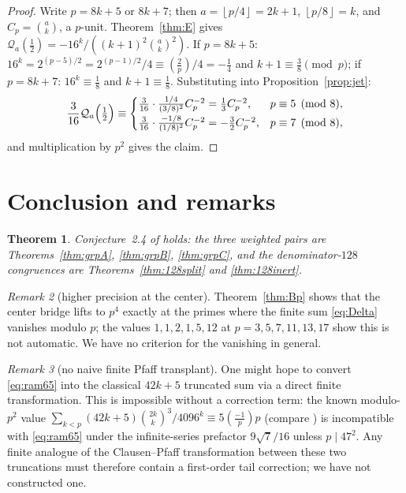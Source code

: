 \documentclass[11pt]{amsart}
\newtheorem{theorem}{Theorem}[section]
\theoremstyle{definition}
\theoremstyle{remark}
\newtheorem{remark}[theorem]{Remark}
\newcommand{\leg}[2]{\left(\frac{#1}{#2}\right)}
\newcommand{\fl}[1]{\left\lfloor #1 \right\rfloor}
\begin{document}
\begin{proof}
Write $p=8k+5$ or $8k+7$; then $a=\fl{p/4}=2k+1$, $\fl{p/8}=k$, and
$C_p=\binom{a}{k}$, a $p$-unit. Theorem~\ref{thm:E} gives
$\mathcal Q_a(\frac12)=-16^k/((k+1)^2\binom{a}{k}^2)$.
If $p=8k+5$: $16^k=2^{(p-5)/2}=2^{(p-1)/2}/4\equiv\leg2p/4=-\frac14$
and $k+1\equiv\frac38\pmod p$; if $p=8k+7$: $16^k\equiv\frac18$ and
$k+1\equiv\frac18$. Substituting into Proposition~\ref{prop:jet}:
\[
\frac{3}{16}\mathcal Q_a\Bigl(\tfrac12\Bigr)\equiv
\begin{cases}
\frac{3}{16}\cdot\frac{1/4}{(3/8)^2}C_p^{-2}=\frac13C_p^{-2},&p\equiv5\pmod8,\\[1mm]
\frac{3}{16}\cdot\frac{-1/8}{(1/8)^2}C_p^{-2}=-\frac32C_p^{-2},&p\equiv7\pmod8,
\end{cases}
\]
and multiplication by $p^2$ gives the claim.
\end{proof}

\section{Conclusion and remarks}\label{sec:8}

\begin{theorem}\label{thm:final}
Conjecture~2.4 of \cite{Sun24} holds: the three weighted pairs are
Theorems~\ref{thm:grpA}, \ref{thm:grpB}, \ref{thm:grpC}, and the
denominator-$128$ congruences are Theorems~\ref{thm:128split} and
\ref{thm:128inert}.
\end{theorem}

\begin{remark}[higher precision at the center]
Theorem~\ref{thm:Bp} shows that the center bridge lifts to $p^4$
exactly at the primes where the finite sum \eqref{eq:Delta} vanishes
modulo $p$; the values $1,1,2,1,5,12$ at $p=3,5,7,11,13,17$ show this
is not automatic. We have no criterion for the vanishing in general.
\end{remark}

\begin{remark}[no naive finite Pfaff transplant]\label{rem:pfaff}
One might hope to convert \eqref{eq:ram65} into the classical $42k+5$
truncated sum via a direct finite transformation. This is impossible
without a correction term: the known modulo-$p^2$ value
$\sum_{k<p}(42k+5)\binom{2k}{k}^3/4096^k\equiv5\leg{-1}{p}p$
(compare \cite[Theorem~1.1]{OZ}) is incompatible with
\eqref{eq:ram65} under the infinite-series prefactor $9\sqrt7/16$
unless $p\mid47^2$. Any finite analogue of the Clausen--Pfaff
transformation between these two truncations must therefore contain a
first-order tail correction; we have not constructed one.
\end{remark}
\end{document}
